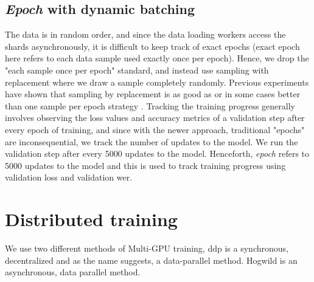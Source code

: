 \subsection{\emph{Epoch} with dynamic batching}
The data is in random order, and since the data loading workers access the shards asynchronously, it is difficult to keep track of exact epochs (exact epoch here refers to each data sample used exactly once per epoch). Hence, we drop the "each sample once per epoch" standard, and instead use sampling with replacement where we draw a sample completely randomly. Previous experiments have shown that sampling by replacement is as good as or in some cases better than one sample per epoch strategy \cite{Recht2012BeneathConsequences, Nielsen2015NeuralLearning}. Tracking the training progress generally involves observing the loss values and accuracy metrics of a validation step after every epoch of training, and since with the newer approach, traditional "epochs" are inconsequential, we track the number of updates to the model. We run the validation step after every 5000 updates to the model. Henceforth, \emph{epoch} refers to 5000 updates to the model and this is used to track training progress using validation loss and validation \acrshort{wer}.

\section{Distributed training}
\label{section:di}
We use two different methods of Multi-GPU training, \acrfull{ddp} is a synchronous, decentralized and as the name suggests, a data-parallel method. Hogwild is an asynchronous, data parallel method. 

